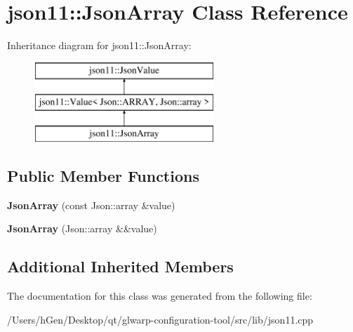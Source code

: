 \hypertarget{classjson11_1_1_json_array}{}\section{json11\+:\+:Json\+Array Class Reference}
\label{classjson11_1_1_json_array}
Inheritance diagram for json11\+:\+:Json\+Array\+:\begin{figure}[H]
\begin{center}
\leavevmode
\includegraphics[height=3.000000cm]{classjson11_1_1_json_array}
\end{center}
\end{figure}
\subsection*{Public Member Functions}
\begin{DoxyCompactItemize}
\item 
\mbox{\label{classjson11_1_1_json_array_a305a9591c44b22ffc91a371b8248d5a4}} 
{\bfseries Json\+Array} (const Json\+::array \&value)
\item 
\mbox{\label{classjson11_1_1_json_array_ae360edbd727b3126f7174c86a24003e1}} 
{\bfseries Json\+Array} (Json\+::array \&\&value)
\end{DoxyCompactItemize}
\subsection*{Additional Inherited Members}


The documentation for this class was generated from the following file\+:\begin{DoxyCompactItemize}
\item 
/\+Users/h\+Gen/\+Desktop/qt/glwarp-\/configuration-\/tool/src/lib/json11.\+cpp\end{DoxyCompactItemize}
